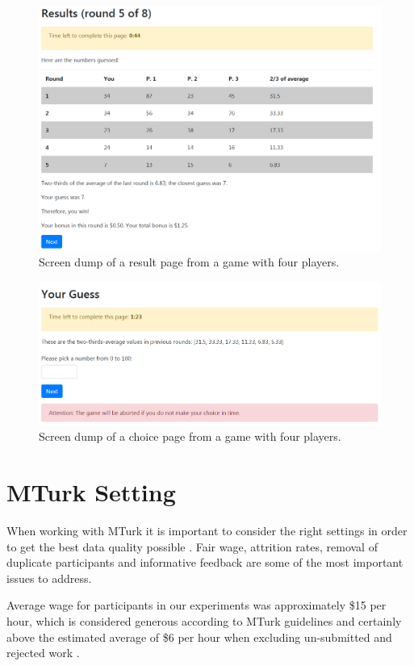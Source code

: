 \begin{figure}
\includegraphics[width=1\textwidth]{../images/FigA3.png}\caption{Screen dump of a result page from a game with four players.}
\label{Fig S3}
\end{figure}

\begin{figure}
\includegraphics[width=1\textwidth]{../images/FigA4.png}\caption{Screen dump of a choice page from a game with four players.}
\label{Fig S4}
\end{figure}

\section{MTurk Setting}
When working with MTurk it is important to consider the right settings in order to get the best data quality possible \citep{ChandlerShapiro16}. Fair wage, attrition rates, removal of duplicate participants and informative feedback are some of the most important issues to address.

Average wage for participants in our experiments was approximately \$15 per hour, which is considered generous according to MTurk guidelines and certainly above the estimated average of \$6 per hour when excluding un-submitted and rejected work \citep{HaraEtAl18}. 

